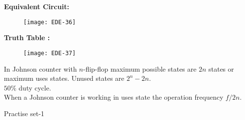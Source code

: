 \begin{enumerate}
\textbf { Equivalent Circuit: }
\begin{figure}[H]
	\centering
	\texttt{[image: EDE-36]}
\end{figure}
\textbf { Truth Table : }
\begin{figure}[H]
	\centering
	\texttt{[image: EDE-37]}
\end{figure}
In Johnson counter with $n$-flip-flop maximum possible states are $2 n$ states or maximum uses states. Unused states are $2^{n}-2 n$.\\
$50 \%$ duty cycle.\\
When a Johnson counter is working in uses state the operation frequency $f / 2 n$.\\
 \end{enumerate}
\newpage
\begin{abox}
	Practise set-1
\end{abox}
